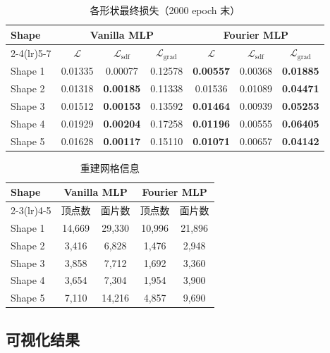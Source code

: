 \documentclass[12pt, a4paper]{article}
\begin{document}
\begin{table}[H]
  \centering
  \caption{各形状最终损失（2000 epoch 末）}
  \begin{tabular}{lcccccc}
    \toprule
    Shape & \multicolumn{3}{c}{Vanilla MLP} & \multicolumn{3}{c}{Fourier MLP} \\
    \cmidrule(lr){2-4}\cmidrule(lr){5-7}
    & $\mathcal{L}$ & $\mathcal{L}_\text{sdf}$ & $\mathcal{L}_\text{grad}$ & $\mathcal{L}$ & $\mathcal{L}_\text{sdf}$ & $\mathcal{L}_\text{grad}$ \\
    \midrule
    Shape 1 & 0.01335 & 0.00077 & 0.12578 & \textbf{0.00557} & 0.00368 & \textbf{0.01885} \\
    Shape 2 & 0.01318 & \textbf{0.00185} & 0.11338 & 0.01536 & 0.01089 & \textbf{0.04471} \\
    Shape 3 & 0.01512 & \textbf{0.00153} & 0.13592 & \textbf{0.01464} & 0.00939 & \textbf{0.05253} \\
    Shape 4 & 0.01929 & \textbf{0.00204} & 0.17258 & \textbf{0.01196} & 0.00555 & \textbf{0.06405} \\
    Shape 5 & 0.01628 & \textbf{0.00117} & 0.15110 & \textbf{0.01071} & 0.00657 & \textbf{0.04142} \\
    \bottomrule
  \end{tabular}
\end{table}

\begin{table}[H]
  \centering
  \caption{重建网格信息}
  \begin{tabular}{lcccc}
    \toprule
    Shape & \multicolumn{2}{c}{Vanilla MLP} & \multicolumn{2}{c}{Fourier MLP} \\
    \cmidrule(lr){2-3}\cmidrule(lr){4-5}
          & 顶点数 & 面片数 & 顶点数 & 面片数 \\
    \midrule
    Shape 1 & 14{,}669 & 29{,}330 & 10{,}996 & 21{,}896 \\
    Shape 2 &  3{,}416 &  6{,}828 &  1{,}476 &  2{,}948 \\
    Shape 3 &  3{,}858 &  7{,}712 &  1{,}692 &  3{,}360 \\
    Shape 4 &  3{,}654 &  7{,}304 &  1{,}954 &  3{,}900 \\
    Shape 5 &  7{,}110 & 14{,}216 &  4{,}857 &  9{,}690 \\
    \bottomrule
  \end{tabular}
\end{table}

\subsection{可视化结果}
\end{document}
